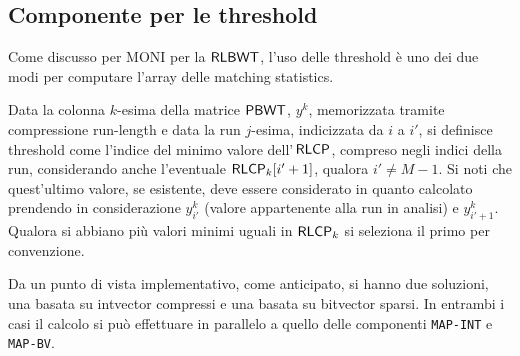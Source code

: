 \subsection{Componente per le threshold}
Come discusso per MONI per la $\mbox{\rm {\sf RLBWT}}$, l'uso delle threshold è 
uno dei due modi per computare l'array delle matching statistics. \\
\begin{definizione}
  Data la colonna $k$-esima della matrice $\mbox{\rm {\sf PBWT}}$, $y^k$, memorizzata
  tramite compressione run-length e data la run $j$-esima, indicizzata
  da $i$ a $i'$, si definisce threshold come l'indice del minimo valore
  dell'$\,\mbox{\rm {\sf RLCP}}$,
  compreso negli indici della run, considerando anche l'eventuale 
  $\mbox{\rm {\sf RLCP}}_k[i'+1]$, qualora $i'\neq M-1$. Si noti che quest'ultimo valore, se
  esistente, deve essere considerato in quanto calcolato prendendo in
  considerazione $y^k_{i'}$ (valore appartenente alla run in analisi) e
  $y^k_{i'+1}$. \\
  Qualora si abbiano più valori minimi uguali in $\mbox{\rm {\sf RLCP}}_k$ si seleziona il primo
  per convenzione.
\end{definizione}
Da un punto di vista implementativo, come anticipato, si hanno due soluzioni,
una basata su intvector compressi e una basata su bitvector sparsi. In
entrambi i casi il calcolo si può effettuare in parallelo a quello delle
componenti \texttt{MAP-INT} e \texttt{MAP-BV}.
